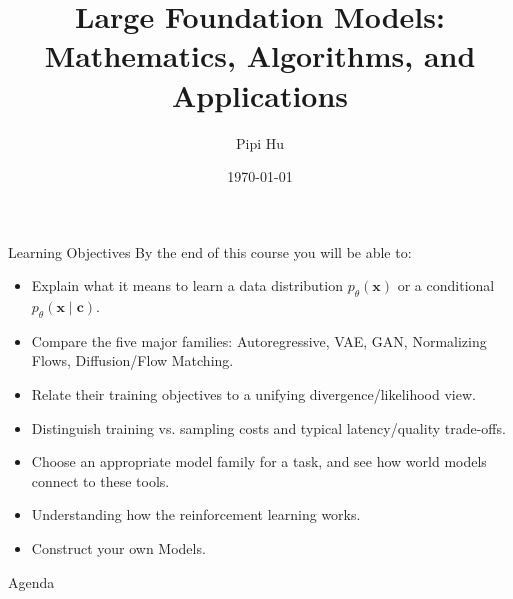 \documentclass[aspectratio=169]{beamer}
\title[Large Foundation models]{Large Foundation Models: Mathematics, Algorithms, and Applications
}
\author{Pipi Hu}
\institute[BIMSA]{Beijing Institute of Mathematical Sciences and Applications}
\date{\today}
\begin{document}
\begin{frame}
  \titlepage
\end{frame}

\begin{frame}{Learning Objectives}
\small
By the end of this course you will be able to:
\begin{itemize}
  \item Explain what it means to learn a data distribution $p_\theta(\mathbf{x})$ or a conditional $p_\theta(\mathbf{x}\mid\mathbf{c})$.
  \item Compare the five major families: Autoregressive, VAE, GAN, Normalizing Flows, Diffusion/Flow Matching.
  \item Relate their training objectives to a unifying divergence/likelihood view.
  \item Distinguish training vs. sampling costs and typical latency/quality trade-offs.
  \item Choose an appropriate model family for a task, and see how world models connect to these tools.
  \item Understanding how the reinforcement learning works.
  \item Construct your own Models.
\end{itemize}
\end{frame}

\begin{frame}{Agenda}
  \tableofcontents
\end{frame}
\end{document}
